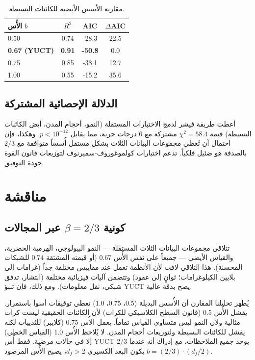 \documentclass[11pt,a4paper]{article}
\newcommand{\df}{d_f}
\begin{document}
\begin{otherlanguage}{english}
		\begin{table}[htbp]
			\centering
			\caption{مقارنة الأُسس الأيضية للكائنات البسيطة.}
			\label{tab:comparison_metab}
			\begin{tabular}{lccc}
				\toprule
				\textbf{الأُس \(b\)} & \(R^2\) & AIC & \(\Delta\)AIC \\
				\midrule
				0.50 & 0.74 & -28.3 & 22.5 \\
				\textbf{0.67 (YUCT)} & \textbf{0.91} & \textbf{-50.8} & 0.0 \\
				0.75 & 0.85 & -38.1 & 12.7 \\
				1.00 & 0.55 & -15.2 & 35.6 \\
				\bottomrule
			\end{tabular}
		\end{table}
	\end{otherlanguage}
	
	\subsection{الدلالة الإحصائية المشتركة}
	
	أعطت طريقة فيشر لدمج الاختبارات المستقلة (النمو، أحجام المدن، أيض الكائنات البسيطة) قيمة \(\chi^2 = 58.4\) مشتركة مع 6 درجات حرية، مما يقابل \(p < 10^{-12}\). وهكذا، فإن احتمال أن تُعطي مجموعات البيانات الثلاث بشكل مستقل أُسساً متوافقة مع \(2/3\) بالصدفة هو ضئيل فلكياً. تدعم اختبارات كولموغوروف-سميرنوف لتوزيعات قانون القوة جودة التوفيق.
	
	\section{مناقشة}
	
	\subsection{كونية \(\beta = 2/3\) عبر المجالات}
	
	تتلاقى مجموعات البيانات الثلاث المستقلة — النمو البيولوجي، الهرمية الحضرية، والقياس الأيضي — جميعاً على نفس الأُس \(0.67\) (أو قيمته المشتقة \(0.74\) للشبكات المحسنة). هذا التلاقي لافت لأن الأنظمة تعمل عند مقاييس مختلفة جداً (غرامات إلى بلايين الكيلوغرامات؛ ثوانٍ إلى عقود) وتتضمن آليات فيزيائية مختلفة (انتشار، تدفق شبكي، نقل معلومات). ومع ذلك، فإن تنبؤ YUCT يصح بدقة عالية.
	
	يُظهر تحليلنا المقارن أن الأُسس البديلة (0.5، 0.75، 1.0) تعطي توفيقات أسوأ باستمرار. يفشل الأُس 0.5 (قانون السطح الكلاسيكي للكرات) لأن الكائنات الحقيقية ليست كرات مثالية ولأن النمو ليس متساوي القياس تماماً. يعمل الأُس 0.75 (كلايبر) للثدييات لكنه يفشل للكائنات البسيطة ولتوزيعات أحجام المدن. لا يُلاحظ الأُس 1.0 (القياس الخطي) إلا في حالات مرضية. فقط أُس YUCT \(2/3\) يوحد جميع الملاحظات، مع إدراك أنه عندما يكون البعد الكسيري \(\df > 2\)، يصبح الأُس المرصود \(b = (2/3) \cdot (\df/2)\).
	
\end{document}
